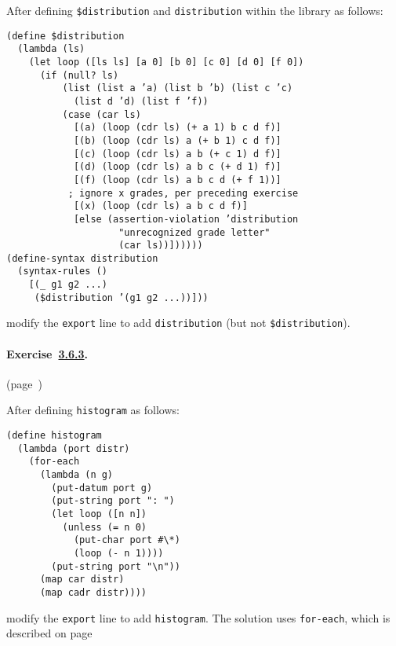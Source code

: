   After defining \texttt{\${}distribution} and \texttt{distribution} within the library as follows: 
\begin{alltt}
(define \${}distribution
   (lambda (ls)
     (let loop ([ls ls] [a 0] [b 0] [c 0] [d 0] [f 0])
       (if (null? ls)
           (list (list a 'a) (list b 'b) (list c 'c)
             (list d 'd) (list f 'f))
           (case (car ls)
             [(a) (loop (cdr ls) (+ a 1) b c d f)]
             [(b) (loop (cdr ls) a (+ b 1) c d f)]
             [(c) (loop (cdr ls) a b (+ c 1) d f)]
             [(d) (loop (cdr ls) a b c (+ d 1) f)]
             [(f) (loop (cdr ls) a b c d (+ f 1))]
            ; ignore x grades, per preceding exercise
             [(x) (loop (cdr ls) a b c d f)]
             [else (assertion-violation 'distribution
                     "unrecognized grade letter"
                     (car ls))])))))
 (define-syntax distribution
   (syntax-rules ()
     [(\_{} g1 g2 ...)
      (\${}distribution '(g1 g2 ...))]))
\end{alltt}

modify the \texttt{export} line to add \texttt{distribution} (but not \texttt{\${}distribution}). 


\paragraph{Exercise \hyperref[further_g87]{3.6.3}. }(page \pageref{further_s92})

  After defining \texttt{histogram} as follows: 
\begin{alltt}
(define histogram
   (lambda (port distr)
     (for-each
       (lambda (n g)
         (put-datum port g)
         (put-string port ": ")
         (let loop ([n n])
           (unless (= n 0)
             (put-char port \#{}\textbackslash{}*)
             (loop (- n 1))))
         (put-string port "\textbackslash{}n"))
       (map car distr)
       (map cadr distr))))
\end{alltt}

modify the \texttt{export} line to add \texttt{histogram}. The solution uses \texttt{for-each}, which is described on page \pageref{control_desc_for_each} 

  
  
